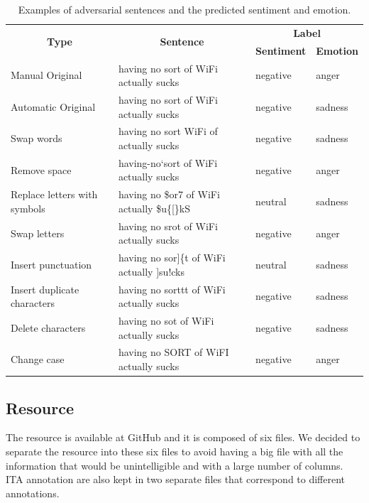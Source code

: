 \documentclass[11pt,a4paper]{article}
\begin{document}
\begin{table}[ht]
\centering
\begin{tabular}{llll}
\hline
\multicolumn{1}{c}{\multirow{2}{*}{\textbf{Type}}} & \multicolumn{1}{c}{\multirow{2}{*}{\textbf{Sentence}}} & \multicolumn{2}{c}{\textbf{Label}} \\ \cline{3-4} 
\multicolumn{1}{c}{} & \multicolumn{1}{c}{} & \multicolumn{1}{c}{\textbf{Sentiment}} & \multicolumn{1}{c}{\textbf{Emotion}} \\ \hline
Manual Original & having no sort of WiFi actually sucks & negative & anger \\
Automatic Original & having no sort of WiFi actually sucks & negative & sadness \\
Swap words & having no sort WiFi of actually sucks & negative & sadness \\
Remove space & having-no`sort of WiFi actually sucks & negative & anger \\
Replace letters with symbols & having no \$or7 of WiFi actually \$u\{[\}kS & neutral & sadness \\
Swap letters & having no srot of WiFi actually sucks & negative & anger \\
Insert punctuation & having no sor{]}\{t of WiFi actually {]}su!cks & neutral & sadness \\
Insert duplicate characters & having no sorttt of WiFi actually sucks & negative & sadness \\
Delete characters & having no sot of WiFi actually sucks & negative & sadness \\
Change case & having no SORT of WiFI actually sucks & negative & anger \\ \hline
\end{tabular}
\caption{Examples of adversarial sentences and the predicted sentiment and emotion.}
\label{tab:adversarial}
\end{table}

\subsection{Resource}
The resource is available at GitHub and it is composed of six files. We decided to separate the resource into these six files to avoid having a big file with all the information that would be unintelligible and with a large number of columns. ITA annotation are also kept in two separate files that correspond to different annotations.
\end{document}

